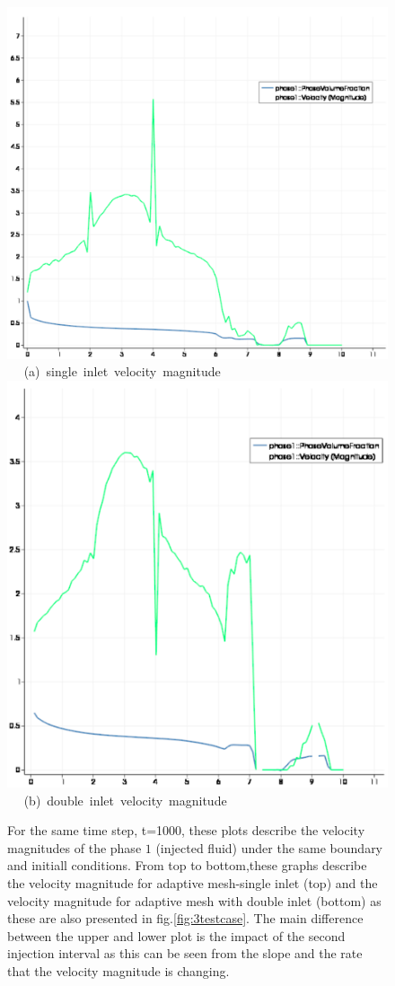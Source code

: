 \begin{figure}[ht] 
\vbox{
\hbox{\hspace{3.5cm}
\includegraphics[width=.5\textwidth]{./Pics1/mr10_5regions_adapt/5regions_adapt_vel_magn.pdf} 
}
\vspace{0.0cm}
\hbox{\hspace{5.0cm} (a) single inlet velocity magnitude   
}
\hbox{\hspace{3.5cm}
\includegraphics[width=.5\textwidth]{./Pics1/mr10_5regions_adapt_dinlet/5regions_dinlet_adapt_vel_magn.pdf}
}
\vspace{0.0cm}
\hbox{\hspace{5.0cm} (b) double inlet velocity magnitude   
}
}     
\caption{For the same time step, t=1000, these plots describe the velocity magnitudes of the phase $1$ (injected fluid) under the same boundary and initiall conditions. From top to bottom,these graphs describe the velocity magnitude %
for adaptive mesh-single inlet (top) and the velocity magnitude for adaptive mesh with double inlet (bottom) as these are also presented in fig.\ref{fig:3testcase}. The main difference between the upper and lower plot %
is the impact of the second injection interval as this can be seen from the slope and the rate that the velocity magnitude is changing.}
\label{fig:vel_magn}
\end{figure}




